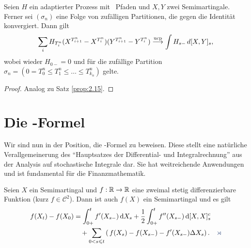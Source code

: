 \begin{theorem}
\label{prop:2.20}
Seien $H$ ein adaptierter Prozess mit \cadlag\ Pfaden und
$X,Y$ zwei Semimartingale. Ferner sei $(\sigma_n)$ eine Folge von zufälligen
Partitionen, die gegen die Identität konvergiert. Dann gilt
\begin{align*}
\sum_i H_{T_i^n} (X^{T_{i+1}^n} - X^{T_{i}^n}) (Y^{T_{i+1}^n} -
Y^{T_{i}^n}) \overset{\text{ucp}}{\longrightarrow} \int H_{s-}\, d[X,Y]_s,
\end{align*}
wobei wieder $H_{0-} = 0$ und für die zufällige Partition $\sigma_n =(0 =T_0^n
\le T_1^n \le \ldots \le T_{k_n}^n)$ gelte.\fish
\end{theorem}

\begin{proof}
Analog zu Satz \ref{prop:2.15}.
\end{proof}


\section{Die \Ito-Formel}

Wir sind nun in der Position, die \Ito-Formel zu beweisen. Diese stellt eine
natürliche Verallgemeinerung des "`Hauptsatzes der Differential- und
Integralrechnung"' aus der Analysis auf stochastische Integrale dar. Sie hat
weitreichende Anwendungen und ist fundamental für die Finanzmathematik.

\begin{theorem}
\label{prop:2.21}
Seien $X$ ein Semimartingal und $f:\mathbb{R}\to\mathbb{R}$ eine zweimal stetig
differenzierbare Funktion (kurz $f\in\mathcal{C}^2$). Dann ist auch $f(X)$ ein
Semimartingal und es gilt
\begin{align*}
f(X_t)-f(X_0) 
  & = \int_{0+}^t f'(X_{s-})\dX_s + \frac{1}{2} \int_{0+}^t f''(X_{s-})\,
  \diffd[X,X]_s^c \\
  & \quad + \sum_{0<s\le t} \left(\,f(X_s)-f(X_{s-}) -f'(X_{s-}) \Delta
  X_s\right).\fish
\end{align*}
\end{theorem}


